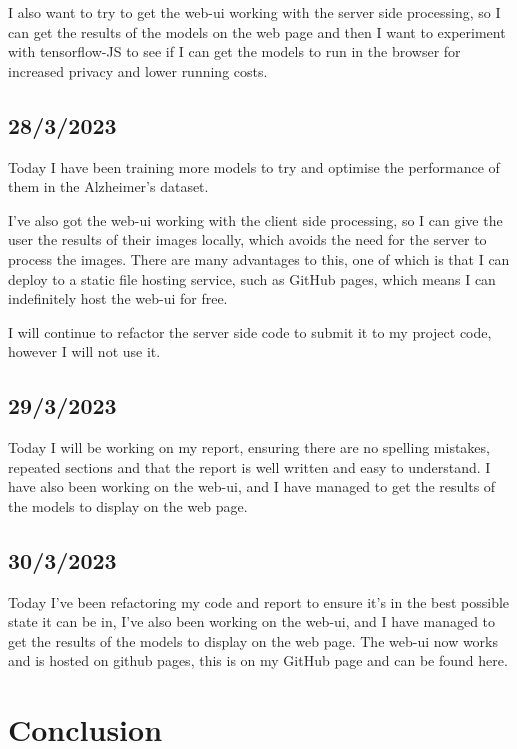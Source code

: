 \documentclass[]{final_report}
\begin{document}
I also want to try to get the web-ui working with the server side processing, so I can get the results of the models on the web page and then I want to experiment with tensorflow-JS to see if I can get the models to run in the browser for increased privacy and lower running costs.

\section*{28/3/2023}

Today I have been training more models to try and optimise the performance of them in the Alzheimer's dataset.

I've also got the web-ui working with the client side processing, so I can give the user the results of their images locally, which avoids the need for the server to process the images. There are many advantages to this, one of which is that I can deploy to a static file hosting service, such as GitHub pages, which means I can indefinitely host the web-ui for free.

I will continue to refactor the server side code to submit it to my project code, however I will not use it.

\section*{29/3/2023}

Today I will be working on my report, ensuring there are no spelling mistakes, repeated sections and that the report is well written and easy to understand.
I have also been working on the web-ui, and I have managed to get the results of the models to display on the web page.

\section*{30/3/2023}

Today I've been refactoring my code and report to ensure it's in the best possible state it can be in, I've also been working on the web-ui, and I have managed to get the results of the models to display on the web page.
The web-ui now works and is hosted on github pages, this is on my GitHub page and can be found here\cite{Hosted-UI}.

\chapter{Conclusion}
\end{document}
